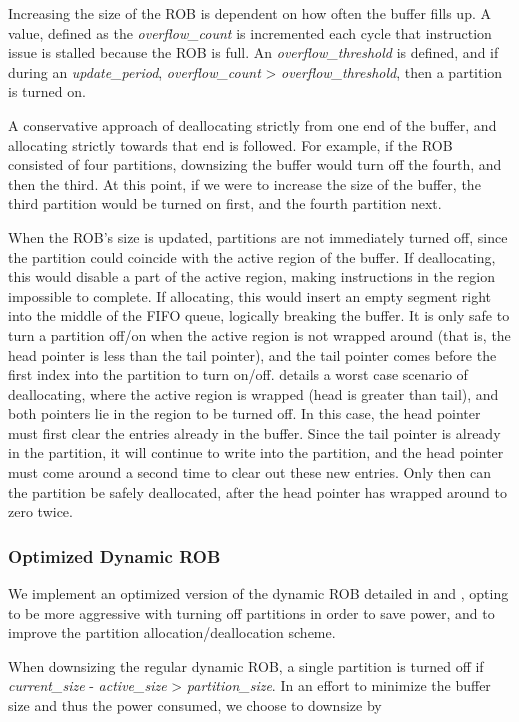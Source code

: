 Increasing the size of the ROB is dependent on how often the buffer fills up. A value, defined as the {\it overflow\_count} is incremented each cycle that instruction issue is stalled because the ROB is full. An {\it overflow\_threshold} is defined, and if during an {\it update\_period}, {\it overflow\_count} > {\it overflow\_threshold}, then a partition is turned on.

A conservative approach of deallocating strictly from one end of the buffer, and allocating strictly towards that end is followed. For example, if the ROB consisted of four partitions, downsizing the buffer would turn off the fourth, and then the third. At this point, if we were to increase the size of the buffer, the third partition would be turned on first, and the fourth partition next.

When the ROB's size is updated, partitions are not immediately turned off, since the partition could coincide with the active region of the buffer. If deallocating, this would disable a part of the active region, making instructions in the region impossible to complete. If allocating, this would insert an empty segment right into the middle of the FIFO queue, logically breaking the buffer. It is only safe to turn a partition off/on when the active region is not wrapped around (that is, the head pointer is less than the tail pointer), and the tail pointer comes before the first index into the partition to turn on/off. \cite{kucuk3} details a worst case scenario of deallocating, where the active region is wrapped (head is greater than tail), and both pointers lie in the region to be turned off. In this case, the head pointer must first clear the entries already in the buffer. Since the tail pointer is already in the partition, it will continue to write into the partition, and the head pointer must come around a second time to clear out these new entries. Only then can the partition be safely deallocated, after the head pointer has wrapped around to zero twice.

\subsubsection{Optimized Dynamic ROB}
We implement an optimized version of the dynamic ROB detailed in \cite{kucuk2} and \cite{kucuk3}, opting to be more aggressive with turning off partitions in order to save power, and to improve the partition allocation/deallocation scheme.

When downsizing the regular dynamic ROB, a single partition is turned off if {\it current\_size} - {\it active\_size} > {\it partition\_size}. In an effort to minimize the buffer size and thus the power consumed, we choose to downsize by

